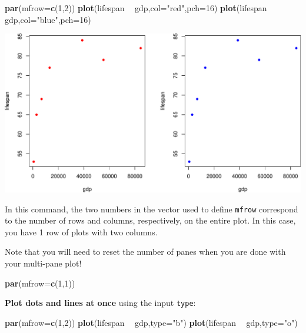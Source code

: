 \documentclass[
]{book}
\newenvironment{Shaded}{\begin{snugshade}}{\end{snugshade}}
\newcommand{\DataTypeTok}[1]{\textcolor[rgb]{0.13,0.29,0.53}{#1}}
\newcommand{\DecValTok}[1]{\textcolor[rgb]{0.00,0.00,0.81}{#1}}
\newcommand{\KeywordTok}[1]{\textcolor[rgb]{0.13,0.29,0.53}{\textbf{#1}}}
\newcommand{\NormalTok}[1]{#1}
\newcommand{\OperatorTok}[1]{\textcolor[rgb]{0.81,0.36,0.00}{\textbf{#1}}}
\newcommand{\StringTok}[1]{\textcolor[rgb]{0.31,0.60,0.02}{#1}}
\begin{document}
\begin{Shaded}
\begin{Highlighting}[]
\KeywordTok{par}\NormalTok{(}\DataTypeTok{mfrow=}\KeywordTok{c}\NormalTok{(}\DecValTok{1}\NormalTok{,}\DecValTok{2}\NormalTok{))}
\KeywordTok{plot}\NormalTok{(lifespan }\OperatorTok{~}\StringTok{ }\NormalTok{gdp,}\DataTypeTok{col=}\StringTok{"red"}\NormalTok{,}\DataTypeTok{pch=}\DecValTok{16}\NormalTok{)}
\KeywordTok{plot}\NormalTok{(lifespan }\OperatorTok{~}\StringTok{ }\NormalTok{gdp,}\DataTypeTok{col=}\StringTok{"blue"}\NormalTok{,}\DataTypeTok{pch=}\DecValTok{16}\NormalTok{)}
\end{Highlighting}
\end{Shaded}

\includegraphics{figures/unnamed-chunk-110-1.pdf}

In this command, the two numbers in the vector used to define \texttt{mfrow} correspond to the number of rows and columns, respectively, on the entire plot. In this case, you have 1 row of plots with two columns.

Note that you will need to reset the number of panes when you are done with your multi-pane plot!

\begin{Shaded}
\begin{Highlighting}[]
\KeywordTok{par}\NormalTok{(}\DataTypeTok{mfrow=}\KeywordTok{c}\NormalTok{(}\DecValTok{1}\NormalTok{,}\DecValTok{1}\NormalTok{))}
\end{Highlighting}
\end{Shaded}

\textbf{Plot dots and lines at once} using the input \texttt{type}:

\begin{Shaded}
\begin{Highlighting}[]
\KeywordTok{par}\NormalTok{(}\DataTypeTok{mfrow=}\KeywordTok{c}\NormalTok{(}\DecValTok{1}\NormalTok{,}\DecValTok{2}\NormalTok{))}
\KeywordTok{plot}\NormalTok{(lifespan }\OperatorTok{~}\StringTok{ }\NormalTok{gdp,}\DataTypeTok{type=}\StringTok{"b"}\NormalTok{)}
\KeywordTok{plot}\NormalTok{(lifespan }\OperatorTok{~}\StringTok{ }\NormalTok{gdp,}\DataTypeTok{type=}\StringTok{"o"}\NormalTok{)}
\end{Highlighting}
\end{Shaded}
\end{document}
